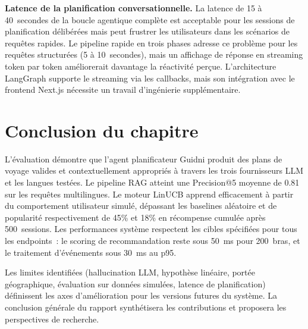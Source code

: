 \textbf{Latence de la planification conversationnelle.} La latence de 15 à 40~secondes de
la boucle agentique complète est acceptable pour les sessions de planification délibérées
mais peut frustrer les utilisateurs dans les scénarios de requêtes rapides. Le pipeline
rapide en trois phases adresse ce problème pour les requêtes structurées (5 à 10~secondes),
mais un affichage de réponse en streaming token par token améliorerait davantage la
réactivité perçue. L'architecture LangGraph supporte le streaming via les callbacks, mais
son intégration avec le frontend Next.js nécessite un travail d'ingénierie supplémentaire.


\section*{Conclusion du chapitre}

L'évaluation démontre que l'agent planificateur Guidni produit des plans de voyage valides
et contextuellement appropriés à travers les trois fournisseurs LLM et les langues testées.
Le pipeline RAG atteint une Precision@5 moyenne de 0.81 sur les requêtes multilingues. Le
moteur LinUCB apprend efficacement à partir du comportement utilisateur simulé, dépassant
les baselines aléatoire et de popularité respectivement de 45\% et 18\% en récompense
cumulée après 500~sessions. Les performances système respectent les cibles spécifiées pour
tous les endpoints~: le scoring de recommandation reste sous 50~ms pour 200~bras, et le
traitement d'événements sous 30~ms au p95.

Les limites identifiées (hallucination LLM, hypothèse linéaire, portée géographique,
évaluation sur données simulées, latence de planification) définissent les axes
d'amélioration pour les versions futures du système. La conclusion générale du rapport
synthétisera les contributions et proposera les perspectives de recherche.
